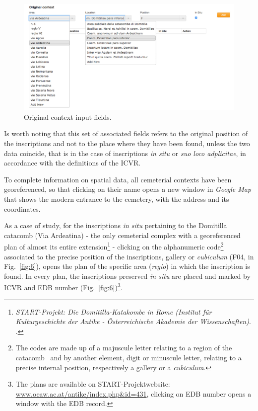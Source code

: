 \documentclass[amsthm,ebook]{saparticle}
\begin{document}
\begin{figure}[hbp]
\centering
 \includegraphics[width=\columnwidth]{EAGLE2016Roccoengrev-img005.jpg} 
\caption{Original context input fields.}
\label{fig:5}
\end{figure}





Is worth noting that this set of associated fields refers to the original position of the inscriptions and not to the
place where they have been found, unless the two data coincide, that is in the case of inscriptions \emph{in situ} or \emph{suo loco
adplicitae}, in accordance with the definitions of the ICVR.

To complete information on spatial data, all cemeterial contexts have been georeferenced, so that clicking on their name
opens a new window in \emph{Google Map} that shows the modern entrance to the cemetery, with the address and its coordinates. 

As a case of study, for the inscriptions \emph{in situ} pertaining to the Domitilla catacomb (Via Ardeatina) - the only
cemeterial complex with a georeferenced plan of almost its entire extension\footnote{\emph{START-Projekt: Die
Domitilla-Katakombe in Rome (Institut für Kulturgeschichte der Antike - Österreichische Akademie der Wissenschaften)}.
\citet{orlandi_case_2014}.} - clicking on the alphanumeric code\footnote{ The codes are made up of a majuscule letter
relating to a region of the catacomb \ and by another element, digit or minuscule letter, relating to a precise
internal position, respectively a gallery or a \emph{cubiculum}. } associated to the precise position of the inscriptions,
gallery or \emph{cubiculum} (F04, in Fig.~\ref{fig:6}), opens the plan of the specific area (\emph{regio}) in which the inscription is found.
In every plan, the inscriptions preserved \emph{in situ} are placed and marked by ICVR and EDB number (Fig.~\ref{fig:6})\footnote{The
plans are available on START-Projektwebsite: \url{www.oeaw.ac.at/antike/index.php\&id=431}, clicking on EDB number opens a
window with the EDB record. }.
\end{document}

